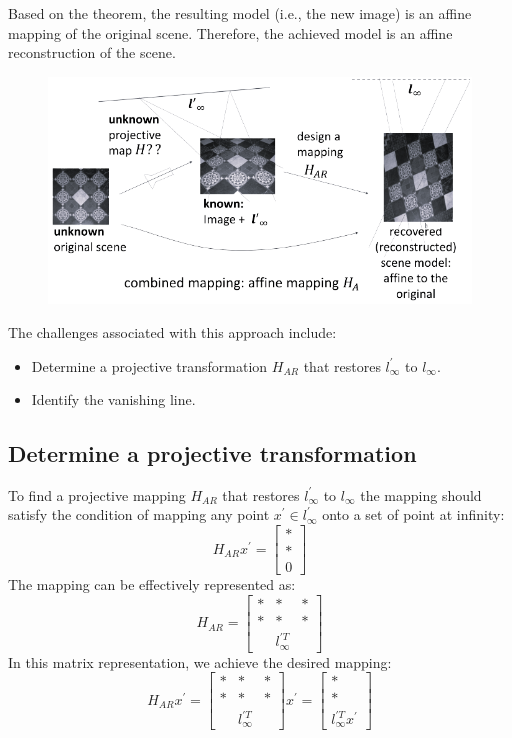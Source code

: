 Based on the theorem, the resulting model (i.e., the new image) is an affine mapping of the original scene. 
Therefore, the achieved model is an affine reconstruction of the scene.
\begin{figure}[H]
    \centering
    \includegraphics[width=0.75\linewidth]{images/HAR.png}
\end{figure}
The challenges associated with this approach include:
\begin{itemize}
    \item Determine a projective transformation $H_{AR}$ that restores $l^{'}_{\infty}$ to $l_{\infty}$.
    \item Identify the vanishing line.
\end{itemize}

\subsection*{Determine a projective transformation}
To find a projective mapping $H_{AR}$ that restores $l^{'}_{\infty}$ to $l_{\infty}$ the mapping should satisfy the condition of mapping any point $x^{'} \in l^{'}_{\infty}$ onto a set of point at infinity: 
\[H_{AR}x^{'} = \begin{bmatrix} * \\ * \\ 0 \end{bmatrix}\]
The mapping can be effectively represented as:
\[H_{AR}=
\begin{bmatrix}
    * & * & * \\
    * & * & * \\
    \: & l^{'T}_{\infty} & \:
\end{bmatrix}\]
In this matrix representation, we achieve the desired mapping: 
\[H_{AR}x^{'}=
\begin{bmatrix}
    * & * & * \\
    * & * & * \\
    \: & l^{'T}_{\infty} & \:
\end{bmatrix}
x^{'}
=
\begin{bmatrix}
    * \\
    * \\
    l^{'T}_{\infty}x^{'}
\end{bmatrix}
\]

